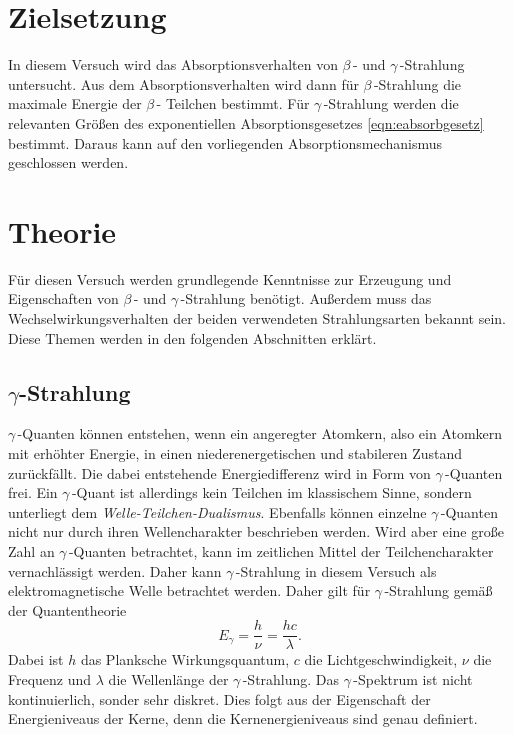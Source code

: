 \section{Zielsetzung}
\label{sec:Ziel}
In diesem Versuch wird das Absorptionsverhalten von $\beta$\,- und $\gamma$\,-Strahlung untersucht. Aus dem Absorptionsverhalten wird dann für $\beta$\,-Strahlung die 
maximale Energie der $\beta$\,- Teilchen bestimmt. Für $\gamma$\,-Strahlung werden die relevanten Größen des exponentiellen Absorptionsgesetzes \ref{eqn:eabsorbgesetz} bestimmt.
Daraus kann auf den vorliegenden Absorptionsmechanismus geschlossen werden.

\section{Theorie}
\label{sec:Theorie}
Für diesen Versuch werden grundlegende Kenntnisse zur Erzeugung und Eigenschaften von $\beta$\,- und $\gamma$\,-Strahlung benötigt. Außerdem muss das Wechselwirkungsverhalten der
beiden verwendeten Strahlungsarten bekannt sein. Diese Themen werden in den folgenden Abschnitten erklärt.

\subsection{\texorpdfstring{$\gamma$-Strahlung}{Gamma-Strahlung}}
\label{subec:Gammastrahlung}
$\gamma$\,-Quanten können entstehen, wenn ein angeregter Atomkern, also ein Atomkern mit erhöhter Energie, in einen niederenergetischen und stabileren Zustand zurückfällt. Die 
dabei entstehende Energiedifferenz wird in Form von $\gamma$\,-Quanten frei. Ein $\gamma$\,-Quant ist allerdings kein Teilchen im klassischem Sinne, sondern unterliegt 
dem \textit{Welle-Teilchen-Dualismus}. Ebenfalls können einzelne
$\gamma$\,-Quanten nicht nur durch ihren Wellencharakter beschrieben werden. Wird aber eine große Zahl an $\gamma$\,-Quanten betrachtet, kann im zeitlichen Mittel der 
Teilchencharakter vernachlässigt werden. Daher kann $\gamma$\,-Strahlung in diesem Versuch als elektromagnetische Welle betrachtet werden. 
Daher gilt für $\gamma$\,-Strahlung gemäß der Quantentheorie 
\begin{equation*}
    E_{\gamma} = \frac{h}{\nu} = \frac{hc}{\lambda}.
\end{equation*}
Dabei ist $h$ das Planksche Wirkungsquantum, $c$ die Lichtgeschwindigkeit, $\nu$ die Frequenz und $\lambda$ die Wellenlänge der $\gamma$\,-Strahlung. Das $\gamma$\,-Spektrum ist 
nicht kontinuierlich, sonder sehr diskret. Dies folgt aus der Eigenschaft der Energieniveaus der Kerne, denn die Kernenergieniveaus sind genau definiert.

